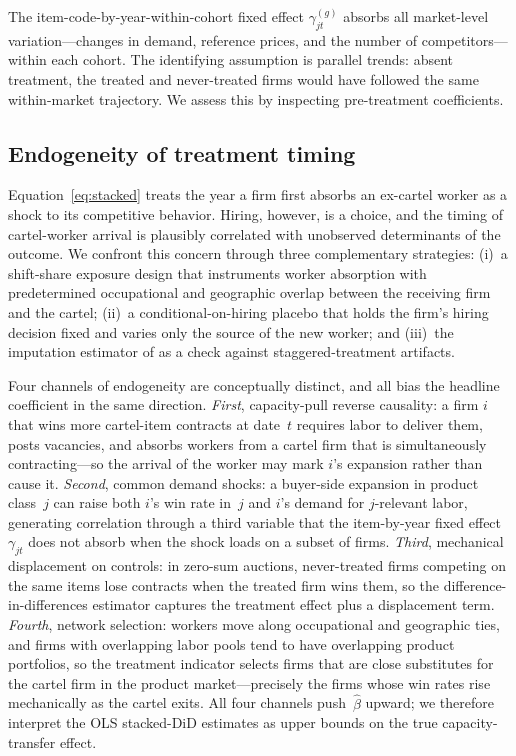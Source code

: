 The item-code-by-year-within-cohort fixed effect $\gamma_{jt}^{(g)}$ absorbs all market-level variation---changes in demand, reference prices, and the number of competitors---within each cohort. The identifying assumption is parallel trends: absent treatment, the treated and never-treated firms would have followed the same within-market trajectory. We assess this by inspecting pre-treatment coefficients.

\subsection{Endogeneity of treatment timing}\label{sec:endogeneity}

Equation~\eqref{eq:stacked} treats the year a firm first absorbs an
ex-cartel worker as a shock to its competitive behavior. Hiring, however,
is a choice, and the timing of cartel-worker arrival is plausibly
correlated with unobserved determinants of the outcome. We confront this
concern through three complementary strategies: (i)~a shift-share exposure
design that instruments worker absorption with predetermined occupational
and geographic overlap between the receiving firm and the cartel; (ii)~a
conditional-on-hiring placebo that holds the firm's hiring decision fixed
and varies only the source of the new worker; and (iii)~the imputation
estimator of \citet{borusyak2024revisiting} as a check against
staggered-treatment artifacts.

Four channels of endogeneity are conceptually distinct, and all bias the
headline coefficient in the same direction. \emph{First}, capacity-pull
reverse causality: a firm $i$ that wins more cartel-item contracts at
date~$t$ requires labor to deliver them, posts vacancies, and absorbs
workers from a cartel firm that is simultaneously contracting---so the
arrival of the worker may mark $i$'s expansion rather than cause it.
\emph{Second}, common demand shocks: a buyer-side expansion in product
class~$j$ can raise both $i$'s win rate in~$j$ and $i$'s demand for
$j$-relevant labor, generating correlation through a third variable that
the item-by-year fixed effect~$\gamma_{jt}$ does not absorb when the shock
loads on a subset of firms. \emph{Third}, mechanical displacement on
controls: in zero-sum auctions, never-treated firms competing on the same
items lose contracts when the treated firm wins them, so the
difference-in-differences estimator captures the treatment effect plus a
displacement term. \emph{Fourth}, network selection: workers move along
occupational and geographic ties, and firms with overlapping labor pools
tend to have overlapping product portfolios, so the treatment indicator
selects firms that are close substitutes for the cartel firm in the
product market---precisely the firms whose win rates rise mechanically as
the cartel exits. All four channels push~$\hat{\beta}$ upward; we
therefore interpret the OLS stacked-DiD estimates as upper bounds on the
true capacity-transfer effect.

